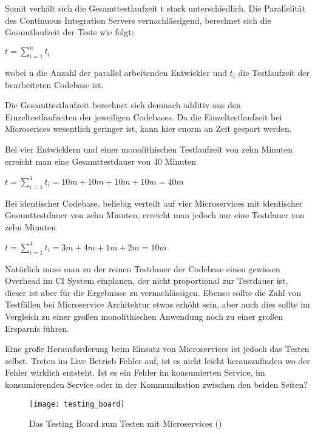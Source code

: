 Somit verhält sich die Gesamttestlaufzeit t stark unterschiedlich. Die Parallelität des Continuous Integration Servers vernachlässigend, berechnet sich die Gesamtlaufzeit der Tests wie folgt:

\begin{center}
$ t = \displaystyle\sum_{i=1}^{n} t_i $
\end{center}

\noindent wobei n die Anzahl der parallel arbeitenden Entwickler und $t_i$ die Testlaufzeit der bearbeiteten Codebase ist.

Die Gesamttestlaufzeit berechnet sich demnach additiv aus den Einzeltestlaufzeiten der jeweiligen Codebases. Da die Einzeltestlaufzeit bei Microserices wesentlich geringer ist, kann hier enorm an Zeit gespart werden.

Bei vier Entwicklern und einer monolithischen Testlaufzeit von zehn Minuten erreicht man eine Gesamttestdauer von 40 Minuten

\begin{center}
$ t = \displaystyle\sum_{i=1}^{4} t_i = 10m + 10m + 10m + 10m = 40m $
\end{center}

\noindent Bei identischer Codebase, beliebig verteilt auf vier Microservices mit identischer Gesamttestdauer von zehn Minuten, erreicht man jedoch nur eine Testdauer von zehn Minuten 

\begin{center}
$ t = \displaystyle\sum_{i=1}^{4} t_i = 3m + 4m + 1m + 2m = 10m $
\end{center}

\noindent Natürlich muss man zu der reinen Testdauer der Codebase einen gewissen Overhead im CI System einplanen, der nicht proportional zur Testdauer ist, dieser ist aber für die Ergebnisse zu vernachlässigen. Ebenso sollte die Zahl von Testfällen bei Microservice Architektur etwas erhöht sein, aber auch dies sollte im Vergleich zu einer großen monolithischen Anwendung noch zu einer großen Ersparnis führen.

Eine große Herausforderung beim Einsatz von Microservices ist jedoch das Testen selbst. Treten im Live Betrieb Fehler auf, ist es nicht leicht herauszufinden wo der Fehler wirklich entsteht. Ist es ein Fehler im konsumierten Service, im konsumierenden Service oder in der Kommunikation zwischen den beiden Seiten?

\begin{wrapfigure}{l}{0.5\textwidth}
    \caption{Das Testing Board zum Testen mit Microservices (\cite{rails:soa})}
    \texttt{[image: testing\_board]}
\end{wrapfigure}

